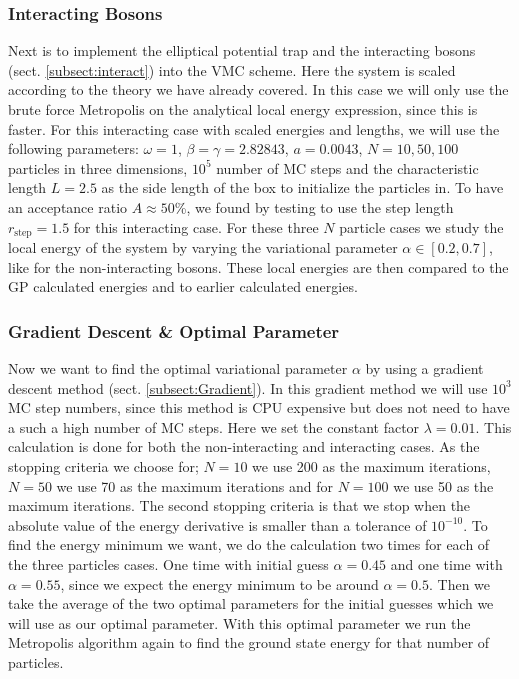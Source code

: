 \documentclass[12pt,a4paper,english]{article}
\begin{document}
\subsubsection{Interacting Bosons}
\label{subsubsect:Coding_int}
Next is to implement the elliptical potential trap and the interacting bosons (sect. \ref{subsect:interact}) into the VMC scheme. Here the system is scaled according to the theory we have already covered. In this case we will only use the brute force Metropolis on the analytical local energy expression, since this is faster. For this interacting case with scaled energies and lengths, we will use the following parameters: $\omega=1$, $\beta=\gamma=2.82843$, $a=0.0043$, $N=10,50,100$ particles in three dimensions, $10^5$ number of MC steps and the characteristic length $L=2.5$ as the side length of the box to initialize the particles in. To have an acceptance ratio $A\approx 50$\%, we found by testing to use the step length $r_{\text{step}}=1.5$ for this interacting case. For these three $N$ particle cases we study the local energy of the system by varying the variational parameter $\alpha\in[0.2,0.7]$, like for the non-interacting bosons. These local energies are then compared to the GP calculated energies and to earlier calculated energies.

\subsubsection{Gradient Descent \& Optimal Parameter}
\label{subsubsect:Coding_gradient}
Now we want to find the optimal variational parameter $\alpha$ by using a gradient descent method (sect. \ref{subsect:Gradient}). In this gradient method we will use $10^3$ MC step numbers, since this method is CPU expensive but does not need to have a such a high number of MC steps. Here we set the constant factor $\lambda=0.01$. This calculation is done for both the non-interacting and interacting cases. As the stopping criteria we choose for; $N=10$ we use 200 as the maximum iterations, $N=50$ we use 70 as the maximum iterations and for $N=100$ we use 50 as the maximum iterations. The second stopping criteria is that we stop when the absolute value of the energy derivative is smaller than a tolerance of $10^{-10}$. To find the energy minimum we want, we do the calculation two times for each of the three particles cases. One time with initial guess $\alpha=0.45$ and one time with $\alpha=0.55$, since we expect the energy minimum to be around $\alpha=0.5$. Then we take the average of the two optimal parameters for the initial guesses which we will use as our optimal parameter. With this optimal parameter we run the Metropolis algorithm again to find the ground state energy for that number of particles.
\end{document}

